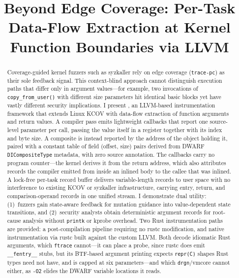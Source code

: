 \documentclass{article}
\title{Beyond Edge Coverage: Per-Task Data-Flow Extraction at Kernel Function Boundaries via LLVM
}
\date{}
\begin{document}
\maketitle

\begin{abstract}
Coverage-guided kernel fuzzers such as syzkaller rely on edge coverage
(\texttt{trace-pc}) as their sole feedback signal. This context-blind approach
cannot distinguish execution paths that differ only in argument values---for
example, two invocations of \texttt{copy\_from\_user()} with different size
parameters hit identical basic blocks yet have vastly different security
implications. I present \toolname{}, an LLVM-based instrumentation framework
that extends Linux KCOV with data-flow extraction of function arguments and
return values. A compiler pass emits lightweight callbacks that report one
source-level parameter per call, passing the value itself in a register
together with its index and byte size. A composite is instead reported by the
address of the object holding it, paired with a constant table of field
(offset, size) pairs derived from DWARF \texttt{DICompositeType} metadata, with
zero source annotation. The callbacks carry no program counter---the kernel
derives it from the return address, which also attributes records the compiler
emitted from inside an inlined body to the callee that was inlined. A lock-free
per-task record buffer delivers variable-length records to user space with no
interference to existing KCOV or syzkaller infrastructure, carrying entry,
return, and comparison-operand records in one unified stream. I demonstrate dual utility:
(1)~fuzzers gain state-aware feedback for mutation guidance into
value-dependent state transitions, and (2)~security analysts obtain
deterministic argument records for root-cause analysis without
\texttt{printk} or kprobe overhead. Two Rust instrumentation paths are
provided: a post-compilation pipeline requiring no rustc modification, and
native instrumentation via rustc built against the custom LLVM. Both decode
idiomatic Rust arguments, which \texttt{ftrace} cannot---it can place a probe,
since rustc does emit \texttt{\_\_fentry\_\_} stubs, but its BTF-based argument
printing expects \texttt{repr(C)} shapes Rust types need not have, and is
capped at six parameters---and which \texttt{drgn}/vmcore cannot either, as
\texttt{-O2} elides the DWARF variable locations it reads.
\end{abstract}

\end{document}
